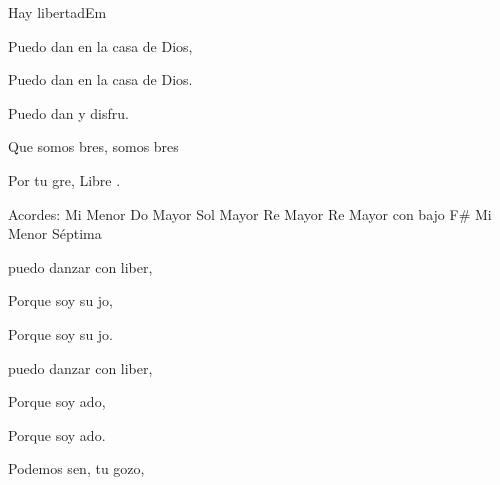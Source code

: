 \documentclass[12pt, spanish]{book}
\begin{document}
\begin{song}{Hay libertad}{Em}
        \begin{SBChorus}
            Puedo dan en la casa de Dios,

            Puedo dan en la casa de Dios.

            Puedo dan y disfru.
        \end{SBChorus}

        \begin{SBChorus}
            Que somos bres, somos bres

            Por tu gre, Libre .
        \end{SBChorus}


        \ifChordBk
        \begin{SBOpGroup}
            Acordes:
            \upchord{\Em}\qquad Mi Menor \hfill
            \upchord{\C}\qquad Do Mayor \hfill\null\break
            \upchord{\G}\qquad Sol Mayor \hfill
            \upchord{\D}\qquad Re Mayor \hfill\null\break
            \upchord{\DFs}\qquad Re Mayor con bajo F\# \hfill
            \upchord{\Emseven}\qquad Mi Menor S\'eptima \hfill\null\break
        \end{SBOpGroup}
        \fi


        \begin{SBExtraKeys}{

            \begin{SBOpGroup}
                 puedo danzar con liber,

                Porque soy su jo,

                Porque soy su jo.
            \end{SBOpGroup}

            \begin{SBOpGroup}
                 puedo danzar con liber,

                Porque soy ado,

                Porque soy ado.
            \end{SBOpGroup}


            \begin{SBOpGroup}
                Podemos sen, tu gozo,


\end{SBOpGroup}}
\end{SBExtraKeys}
\end{song}
\end{document}
